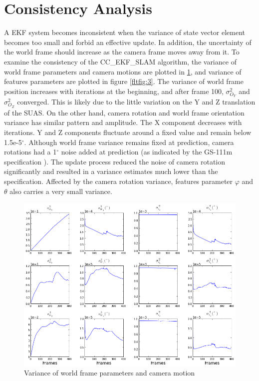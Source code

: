 \section{Consistency Analysis}
A EKF system becomes inconsistent when the variance of state vector
element becomes too small and forbid an effective update. In addition,
the uncertainty of the world frame should increase as the camera frame
moves away from it. To examine the consistency of the CC\_EKF\_SLAM
algorithm, the variance of world frame parameters and camera motions
are plotted in \ref{fltfig:120}, and variance of features parameters
are plotted in figure \ref{fltfig:3}. The variance of world frame
position increases with iterations at the beginning, and after frame
100, $\sigma^2_{O_Y}$ and $\sigma^2_{O_Z}$ converged. This is
likely due to the little variation on the Y and Z translation of the
SUAS. On the other hand, camera rotation and world frame orientation
variance has similar pattern and amplitude. The X component decreases
with iterations. Y and Z components fluctuate around a fixed value and
remain below 1.5e-5$^\circ$. Although world frame variance remains fixed
at prediction, camera rotations had a 1$^\circ$ noise added at
prediction (as indicated by the GS-111m specification
\cite{_athena_????}). The update process reduced the noise of camera
rotation significantly and resulted in a variance estimates much lower
than the specification. Affected by the camera rotation variance,
features parameter $\varphi$ and $\theta$ also carries a very small
variance.


\begin{figure}[h]
\centering
\includegraphics[width=14cm, keepaspectratio=true]
{./Figures/fltfig/cut1/Figure120.png}
\caption{Variance of world frame parameters and camera motion}
\label{fltfig:120}
\end{figure}


